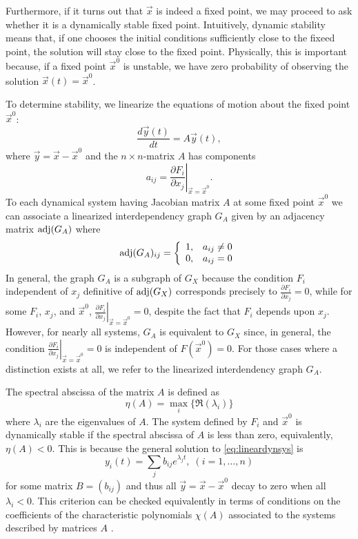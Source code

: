 Furthermore, if it turns out that $\vec x$ is indeed a fixed point, we
may proceed to ask whether it is a dynamically stable fixed point.
Intuitively, dynamic stability means that, if one chooses the initial
conditions sufficiently close to the fixeed point, the solution will
stay close to the fixed point.  Physically, this is important because,
if a fixed point ${\vec x}^0$ is unstable, we have zero probability of
observing the solution ${\vec x}(t) = {\vec x}^0$.

To determine stability, we linearize the equations of motion about the
fixed point $\vec{x}^0$:
\begin{equation}\label{eq:lineardynsys}
\frac{d\vec{y}(t)}{dt} = A \vec{y}(t),
\end{equation}
where $\vec{y} = \vec{x} - \vec{x}^0$ and the $n \times n$-matrix $A$ has components
$$
a_{ij} = \left. \frac{\partial F_i}{\partial x_j} \right|_{\vec{x} = \vec{x}^0}.
$$
To each dynamical system having Jacobian matrix $A$ at some fixed point $\vec{x}^0$ we can associate a linearized interdependency graph $G_A$ given by an adjacency matrix $\mathrm{adj}(G_A)$ where
 \begin{displaymath}
   \mathrm{adj}(G_A)_{ij} = \left\{
     \begin{array}{lr}
       1, & a_{ij} \neq 0\\
       0, & a_{ij} = 0
     \end{array}
   \right.
\end{displaymath}
In general, the graph $G_A$ is a subgraph of $G_X$ because the condition $F_i$ independent of $x_j$ definitive of $\mathrm{adj}(G_X)$ corresponds precisely to $\frac{\partial F_i}{\partial x_j}=0$, while for some $F_i$, $x_j$, and $\vec{x}^0$, $\left. \frac{\partial F_i}{\partial x_j} \right|_{\vec{x} = \vec{x}^0} = 0$, despite the fact that $F_i$ depends upon $x_j$. However, for nearly all systems, $G_A$ is equivalent to $G_X$ since, in general, the condition $\left. \frac{\partial F_i}{\partial x_j} \right|_{\vec{x} = \vec{x}^0} = 0$ is independent of $F(\vec{x}^0)=0$. For those cases where a distinction exists at all, we refer to the linearized interdendency graph $G_A$.

The spectral abscissa of the matrix $A$ is defined as
$$
\eta(A) = \max_i \{\Re(\lambda_i)\}
$$
where $\lambda_i$ are the eigenvalues of $A$. The system defined by $F_i$ and $\vec{x}^0$ is dynamically stable if the spectral abscissa of $A$ is less than zero, equivalently, $\eta(A) < 0$. This is because the general solution to \ref{eq:lineardynsys} is
$$
y_i(t) = \sum_j b_{ij} e^{\lambda_j t}, \; (i=1,\ldots,n)
$$
for some matrix $B=(b_{ij})$ and thus all $\vec{y} = \vec{x} - \vec{x}^0$ decay to zero when all $\lambda_i < 0$. This criterion can be checked equivalently in terms of conditions on the coefficients of the characteristic polynomials $\chi(A)$ associated to the systems described by matrices $A$ \cite{Gantmacher1959}.

